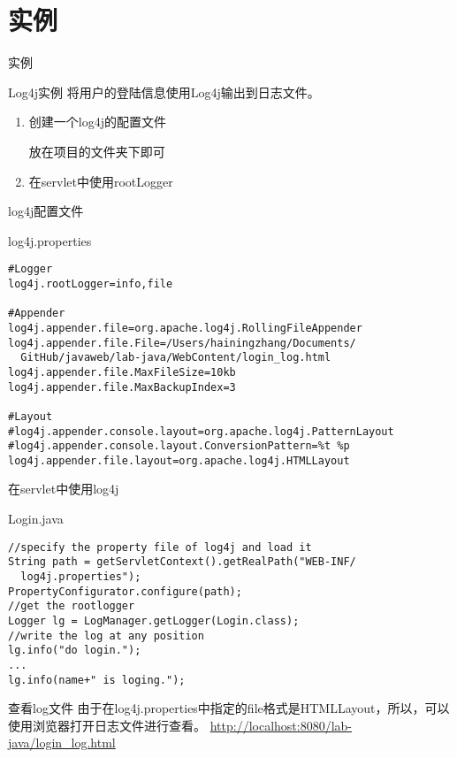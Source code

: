 \documentclass{beamer}
\begin{document}
\section{实例}
\begin{frame}
\Huge{\centerline{实例}}
\end{frame}

\begin{frame}{Log4j实例}
将用户的登陆信息使用Log4j输出到日志文件。


\begin{enumerate}
\item
创建一个log4j的配置文件

放在项目的文件夹下即可
\item
在servlet中使用rootLogger
\end{enumerate}
\end{frame}
\begin{frame}[fragile]{log4j配置文件}
\begin{block}{log4j.properties}
\begin{verbatim}
#Logger
log4j.rootLogger=info,file

#Appender
log4j.appender.file=org.apache.log4j.RollingFileAppender
log4j.appender.file.File=/Users/hainingzhang/Documents/
  GitHub/javaweb/lab-java/WebContent/login_log.html
log4j.appender.file.MaxFileSize=10kb
log4j.appender.file.MaxBackupIndex=3

#Layout
#log4j.appender.console.layout=org.apache.log4j.PatternLayout
#log4j.appender.console.layout.ConversionPattern=%t %p
log4j.appender.file.layout=org.apache.log4j.HTMLLayout
\end{verbatim}
\end{block}
\end{frame}
\begin{frame}[fragile]{在servlet中使用log4j}
\begin{block}{Login.java}
\begin{verbatim}
//specify the property file of log4j and load it
String path = getServletContext().getRealPath("WEB-INF/
  log4j.properties");
PropertyConfigurator.configure(path);
//get the rootlogger
Logger lg = LogManager.getLogger(Login.class);
//write the log at any position
lg.info("do login.");
...
lg.info(name+" is loging.");
\end{verbatim}
\end{block}

\end{frame}

\begin{frame}{查看log文件}
由于在log4j.properties中指定的file格式是HTMLLayout，所以，可以使用浏览器打开日志文件进行查看。
\url{http://localhost:8080/lab-java/login_log.html}
\end{frame}
\end{document}
